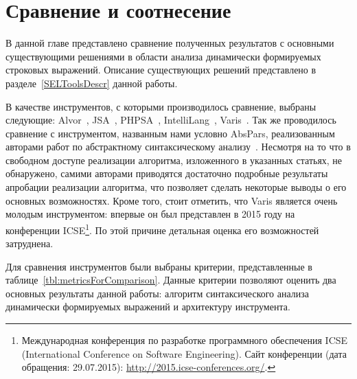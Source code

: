 \chapter{Сравнение и соотнесение} \label{chaptComp}

В данной главе представлено сравнение полученных результатов с основными существующими решениями в области анализа динамически формируемых строковых выражений. Описание существующих решений представлено 
в разделе~\ref{SELToolsDescr} данной работы.

В качестве инструментов, с которыми производилось сравнение, выбраны следующие: Alvor~\cite{AlvorUrl}, JSA~\cite{JSAUrl}, PHPSA~\cite{PHPSAUrl}, IntelliLang~\cite{IntelliLang}, Varis~\cite{Varis}. Так же проводилось сравнение с инструментом, названным нами условно AbsPars, реализованным авторами работ по абстрактному синтаксическому анализу~\cite{LrAbstract1, LrAbstract2, LRAbstractParsingSema}. Несмотря на то что в свободном доступе реализации 
алгоритма, изложенного в указанных статьях, не обнаружено, самими авторами приводятся достаточно подробные результаты апробации реализации алгоритма, что позволяет сделать некоторые выводы о его 
основных возможностях. Кроме того, стоит отметить, что Varis является очень молодым инструментом: впервые он был представлен в 2015 году на конференции ICSE\footnote{Международная конференция по 
разработке программного обеспечения ICSE (International Conference on Software Engineering). Сайт конференции (дата обращения: 29.07.2015): \url{http://2015.icse-conferences.org/}.}. По этой причине детальная оценка его возможностей затруднена. 

Для сравнения инструментов были выбраны критерии, представленные в таблице~\ref{tbl:metricsForComparison}. Данные критерии позволяют оценить два основных результаты данной работы: алгоритм синтаксического анализа динамически 
формируемых выражений и архитектуру инструмента. 

